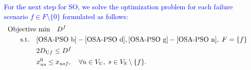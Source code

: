 \documentclass[10pt, letterpaper]{IEEEtran}
\newcommand\blue[1]{\textcolor{blue}{#1}}
\newcommand\red[1]{\textcolor{red}{#1}}
\begin{document}
\begin{CJK}{UTF8}{ipxm}
\blue{
For the next step for SO, we solve the optimization problem for each failure scenario $f \in F \setminus \{0\}$ formulated as follows:
\begin{subequations} \label{OSA-SO}
  \begin{align}
  \text{Objective}&\text{ min}\quad D^f \label{OSA-SO a} \\
  \rm{s.t.} \quad
  & \eqref{OSA-PSO b}-\eqref{OSA-PSO d}, \eqref{OSA-PSO g}-\eqref{OSA-PSO n}, \; F = \{f\} \label{OSA-SO b-d,g-n} \\
  &2D_{\mathrm{U}f} \le D^f \label{OSA-SO h} \\
  &x^0_{us} \le x_{usf}, \quad \forall u \in V_{\rm{U}}, \; s \in V_{\rm{S}} \setminus \{f\}. \label{OSA-SO i}
  \end{align}
\end{subequations}
}
\end{CJK}
\end{document}
